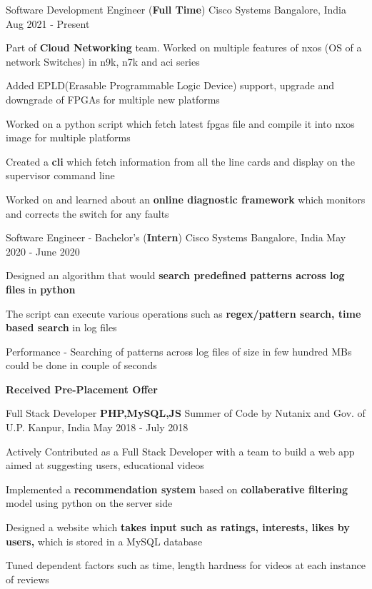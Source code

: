 \begin{cventries}

  \cventry
  {Software Development Engineer  (\textbf{Full Time})}
  {Cisco Systems}
  {Bangalore, India}
  {Aug 2021 - Present}
  {
    \begin{cvitems}
      \item Part of \textbf{Cloud Networking} team. Worked on multiple features of nxos (OS of a network Switches) in n9k, n7k and aci series
      \item Added EPLD(Erasable Programmable Logic Device) support, upgrade and downgrade of FPGAs for multiple new platforms
      \item Worked on a python script which fetch latest fpgas file and compile it into nxos image for multiple platforms
      \item Created a \textbf{cli} which fetch information from all the line cards and display on the supervisor command line
      \item Worked on and learned about an \textbf{online diagnostic framework} which monitors and corrects the switch for any faults 
    \end{cvitems}
  }

  \cventry
  {Software Engineer - Bachelor's (\textbf{Intern})}
  {Cisco Systems}
  {Bangalore, India}
  {May 2020 - June 2020}
  {
    \begin{cvitems}
      \item Designed an algorithm that would \textbf{search predefined patterns across log files} in \textbf{python} 
      \item The script can execute various operations such as \textbf{regex/pattern search, time based search} in log files
      \item	Performance  -  Searching of patterns across log files of size in few hundred MBs could be done in  couple of seconds
      \item \textbf{Received Pre-Placement Offer}
    \end{cvitems}
  }

  \cventry
  {Full Stack Developer {\textbf{PHP,MySQL,JS}}}
  {Summer of Code by Nutanix and Gov. of U.P.}
  {Kanpur, India}
  {May 2018 - July 2018}
  {
    \begin{cvitems}
      \item Actively Contributed as a Full Stack Developer with a team to build a web app aimed at suggesting users, educational videos
      \item Implemented a \textbf{recommendation system} based on \textbf{collaberative filtering} model using python on the server side
      \item Designed a website which \textbf{takes input such as ratings, interests, likes by users,} which is stored in a MySQL database
      \item	Tuned dependent factors such as time, length hardness for videos at each instance of reviews
    \end{cvitems}
  }

\end{cventries}
